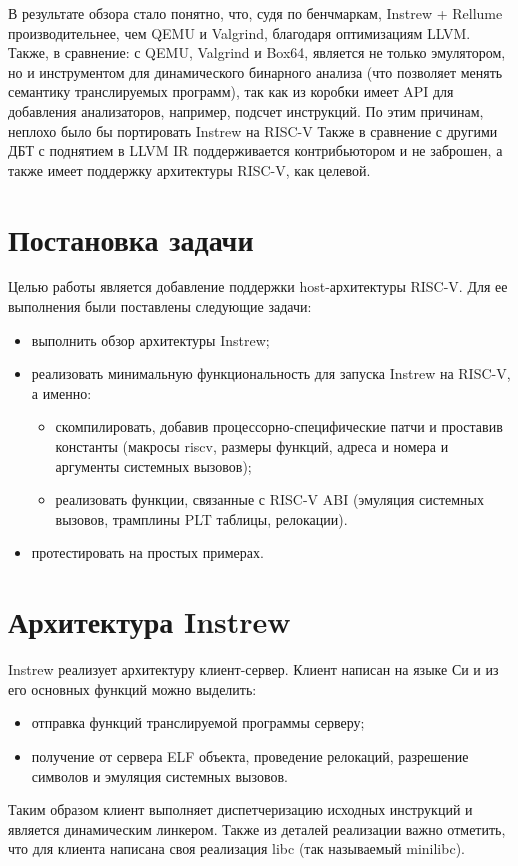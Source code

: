 В результате обзора стало понятно, что, судя по бенчмаркам, Instrew + Rellume производительнее, чем QEMU и Valgrind, благодаря оптимизациям LLVM. Также, в сравнение: с QEMU, Valgrind и Box64, является не только эмулятором, но и инструментом для динамического бинарного анализа (что позволяет менять семантику транслируемых программ), так как из коробки имеет API для добавления анализаторов, например, подсчет инструкций. По этим причинам, неплохо было бы портировать Instrew на RISC-V
Также в сравнение с другими ДБТ с поднятием в LLVM IR поддерживается контрибьютором и не заброшен, а также имеет поддержку архитектуры RISC-V, как целевой.

\section{Постановка задачи}
Целью работы является добавление поддержки host-архитектуры RISC-V. Для ее выполнения были поставлены следующие задачи:
\begin{itemize}
    \item выполнить обзор архитектуры Instrew;
    \item реализовать минимальную функциональность для запуска Instrew на RISC-V, а именно:
          \begin{itemize}
              \item скомпилировать, добавив процессорно-специфические патчи и проставив константы (макросы riscv, размеры функций, адреса и номера и аргументы системных вызовов);
              \item реализовать функции, связанные с RISC-V ABI (эмуляция системных вызовов, трамплины PLT таблицы, релокации).
          \end{itemize}
    \item протестировать на простых примерах.
\end{itemize}

\section{Архитектура Instrew}
Instrew реализует архитектуру клиент-сервер. Клиент написан на языке Си и из его основных функций можно выделить:
\begin{itemize}
    \item отправка функций транслируемой программы серверу;
    \item получение от сервера ELF объекта, проведение релокаций, разрешение символов и эмуляция системных вызовов.
\end{itemize}
Таким образом клиент выполняет диспетчеризацию исходных инструкций и является динамическим линкером. Также из деталей реализации важно отметить, что для клиента написана своя реализация libc (так называемый minilibc).

